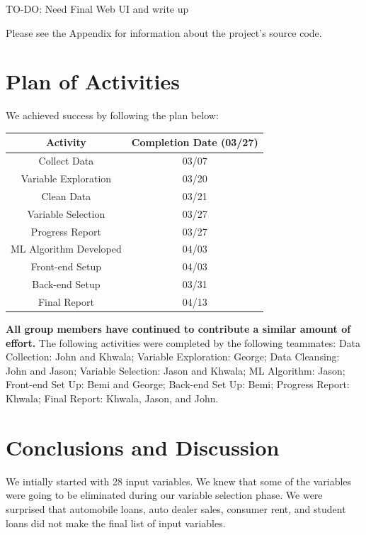 \documentclass[sigconf,nonacm,11pt]{acmart}
\begin{document}
\vspace{0.75em}
TO-DO: Need Final Web UI and write up

Please see the Appendix for information about the project's source code.




\section{Plan of Activities}

We achieved success by following the plan below:\vspace{0.07em}
\begin{center}
    \begin{tabular}{||c|c||}
    \hline
    Activity & Completion Date (03/27)\\
    \hline\hline
    Collect Data & 03/07\\
    Variable Exploration & 03/20\\
    Clean Data & 03/21\\
    Variable Selection & 03/27\\
    Progress Report & 03/27\\
    ML Algorithm Developed & 04/03\\
    Front-end Setup & 04/03\\
    Back-end Setup & 03/31\\
    Final Report & 04/13\\
    \hline
    \end{tabular}
\end{center}

\textbf{All group members have continued to contribute a similar amount of effort.} The following activities were completed by the following teammates: Data Collection: John and Khwala; Variable Exploration: George; Data Cleansing: John and Jason; Variable Selection: Jason and Khwala; ML Algorithm: Jason; Front-end Set Up: Bemi and George; Back-end Set Up: Bemi; Progress Report: Khwala; Final Report: Khwala, Jason, and John. 



\section{Conclusions and Discussion}


We intially started with 28 input variables. We knew that some of the variables were going to be eliminated during our variable selection phase. We were surprised that automobile loans, auto dealer sales, consumer rent, and student loans did not make the final list of input variables. 
\end{document}
